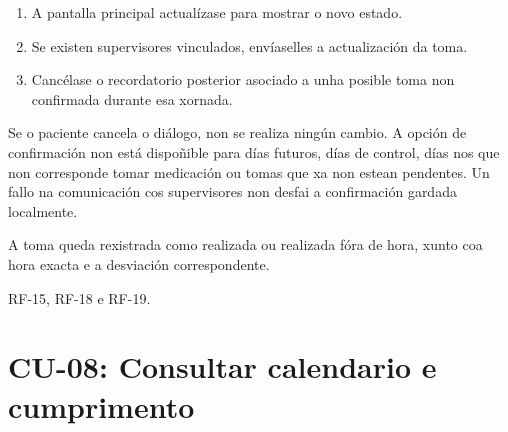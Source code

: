 \begin{description}
\begin{enumerate}
    \item A pantalla principal actualízase para mostrar o novo estado.

    \item Se existen supervisores vinculados, envíaselles a actualización da
    toma.

    \item Cancélase o recordatorio posterior asociado a unha posible toma non
    confirmada durante esa xornada.
\end{enumerate}

\item[Fluxos alternativos:] Se o paciente cancela o diálogo, non se realiza
ningún cambio. A opción de confirmación non está dispoñible para días futuros,
días de control, días nos que non corresponde tomar medicación ou tomas que xa
non estean pendentes. Un fallo na comunicación cos supervisores non desfai a
confirmación gardada localmente.

\item[Postcondicións:] A toma queda rexistrada como realizada ou realizada fóra
de hora, xunto coa hora exacta e a desviación correspondente.

\item[Requisitos relacionados:] RF-15, RF-18 e RF-19.

\end{description}



\section{CU-08: Consultar calendario e cumprimento}
\label{cu:consultar-calendario-cumprimento}

